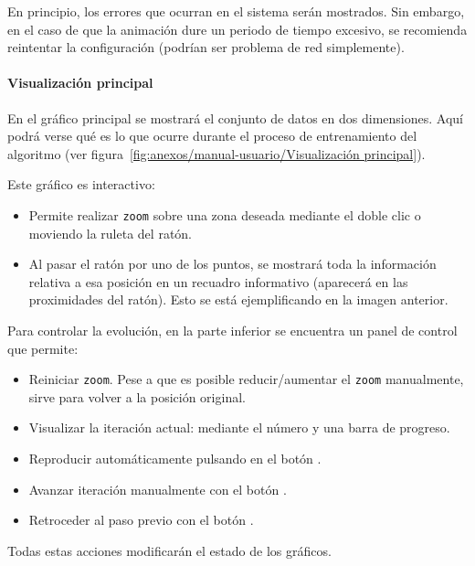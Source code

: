 En principio, los errores que ocurran en el sistema serán mostrados. Sin
embargo, en el caso de que la animación dure un periodo de tiempo excesivo, se
recomienda reintentar la configuración (podrían ser problema de red
simplemente).


\paragraph{Visualización principal} En el gráfico principal se mostrará el
conjunto de datos en dos dimensiones. Aquí podrá verse qué es lo que ocurre
durante el proceso de entrenamiento del algoritmo (ver
figura~\ref{fig:anexos/manual-usuario/Visualización principal}).


Este gráfico es interactivo:
\begin{itemize}
    \item Permite realizar \texttt{zoom} sobre una zona deseada mediante el
    doble clic o moviendo la ruleta del ratón.
    \item Al pasar el ratón por uno de los puntos, se mostrará toda la
    información relativa a esa posición en un recuadro informativo (aparecerá en
    las proximidades del ratón). Esto se está ejemplificando en la imagen
    anterior.
\end{itemize}

Para controlar la evolución, en la parte inferior se encuentra un panel de
control que permite:
\begin{itemize}
    \item Reiniciar \texttt{zoom}. Pese a que es posible reducir/aumentar el
    \texttt{zoom} manualmente, sirve para volver a la posición original.
    \item Visualizar la iteración actual: mediante el número y una barra de
    progreso.
    \item Reproducir automáticamente pulsando en el botón \button{$\blacktriangleright$}.
    \item Avanzar iteración manualmente con el botón \button{$\gg$}.
    \item Retroceder al paso previo con el botón  \button{$\ll$}.
\end{itemize}

Todas estas acciones modificarán el estado de los gráficos.

